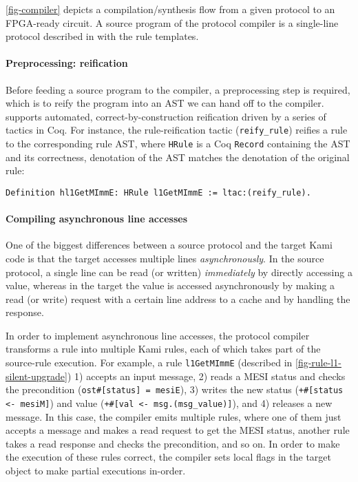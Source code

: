 \documentclass[sigplan,10pt,review,anonymous,screen]{acmart}\settopmatter{printfolios=true,printccs=false,printacmref=false}
\def\slstinline{\lstinline[basicstyle=\ttfamily\small]}
\begin{document}
\autoref{fig-compiler} depicts a compilation/synthesis flow from a given \hemiola{} protocol to an FPGA-ready circuit.
A source program of the protocol compiler is a single-line protocol described in \hemiola{} with the rule templates.

\paragraph{Preprocessing: reification}

Before feeding a \hemiola{} source program to the compiler, a preprocessing step is required, which is to reify the program into an AST we can hand off to the compiler.
\hemiola{} supports automated, correct-by-construction reification driven by a series of tactics in Coq.
For instance, the rule-reification tactic (\slstinline{reify_rule}) reifies a \hemiola{} rule to the corresponding rule AST, where \slstinline{HRule} is a Coq \slstinline{Record} containing the AST and its correctness, \ie{} denotation of the AST matches the denotation of the original rule:
\begin{lstlisting}[numbers=none, frame=none, xleftmargin=10pt]
Definition hl1GetMImmE: HRule l1GetMImmE := ltac:(reify_rule).
\end{lstlisting}

\paragraph{Compiling asynchronous line accesses}

One of the biggest differences between a source \hemiola{} protocol and the target Kami code is that the target accesses multiple lines \emph{asynchronously}.
In the source protocol, a single line can be read (or written) \emph{immediately} by directly accessing a value, whereas in the target the value is accessed asynchronously by making a read (or write) request with a certain line address to a cache and by handling the response.

In order to implement asynchronous line accesses, the protocol compiler transforms a \hemiola{} rule into multiple Kami rules, each of which takes part of the source-rule execution.
For example, a \hemiola{} rule \slstinline{l1GetMImmE} (described in \autoref{fig-rule-l1-silent-upgrade}) 1) accepts an input message, 2) reads a MESI status and checks the precondition (\slstinline{ost#[status] = mesiE}), 3) writes the new status (\slstinline{+#[status <- mesiM]}) and value (\slstinline{+#[val <- msg.(msg_value)]}), and 4) releases a new message.
In this case, the compiler emits multiple rules, where one of them just accepts a message and makes a read request to get the MESI status, another rule takes a read response and checks the precondition, and so on.
In order to make the execution of these rules correct, the compiler sets local flags in the target object to make partial executions in-order.
\end{document}
